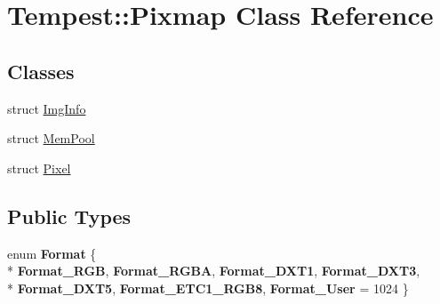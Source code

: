 \hypertarget{class_tempest_1_1_pixmap}{\section{Tempest\+:\+:Pixmap Class Reference}
\label{class_tempest_1_1_pixmap}
}
\subsection*{Classes}
\begin{DoxyCompactItemize}
\item 
struct \hyperlink{struct_tempest_1_1_pixmap_1_1_img_info}{Img\+Info}
\item 
struct \hyperlink{struct_pixmap_1_1_mem_pool}{Mem\+Pool}
\item 
struct \hyperlink{struct_tempest_1_1_pixmap_1_1_pixel}{Pixel}
\end{DoxyCompactItemize}
\subsection*{Public Types}
\begin{DoxyCompactItemize}
\item 
\hypertarget{class_tempest_1_1_pixmap_aff6e4cb1e57c2eaf87520f4f8b87ebea}{enum {\bfseries Format} \{ \\*
{\bfseries Format\+\_\+\+R\+G\+B}, 
{\bfseries Format\+\_\+\+R\+G\+B\+A}, 
{\bfseries Format\+\_\+\+D\+X\+T1}, 
{\bfseries Format\+\_\+\+D\+X\+T3}, 
\\*
{\bfseries Format\+\_\+\+D\+X\+T5}, 
{\bfseries Format\+\_\+\+E\+T\+C1\+\_\+\+R\+G\+B8}, 
{\bfseries Format\+\_\+\+User} = 1024
 \}}\label{class_tempest_1_1_pixmap_aff6e4cb1e57c2eaf87520f4f8b87ebea}

\end{DoxyCompactItemize}
